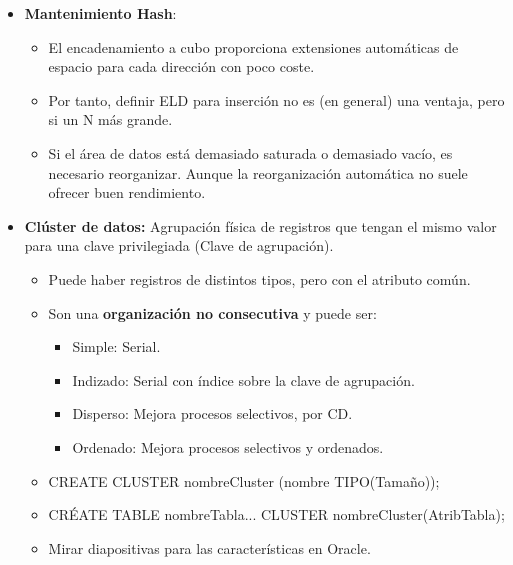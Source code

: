 \documentclass[12pt, twoside, openright]{report} %
\begin{document}
\begin{itemize}
    \item \textbf{Mantenimiento Hash}:
      

      \begin{itemize}
      \item El encadenamiento a cubo proporciona extensiones automáticas de
        espacio para cada dirección con poco coste.
        
      \item Por tanto, definir ELD para inserción no es (en general) una
        ventaja, pero si un N más grande.
        
      \item Si el área de datos está demasiado saturada o demasiado vacío,
        es necesario reorganizar. Aunque la reorganización automática no
        suele ofrecer buen rendimiento.
        
      \end{itemize}
    \item \textbf{Clúster de datos:} Agrupación física de registros que
      tengan el mismo valor para una clave privilegiada (Clave de
      agrupación).
      

      \begin{itemize}
      \item Puede haber registros de distintos tipos, pero con el atributo
        común.
        
      \item Son una \textbf{organización no consecutiva} y puede ser:
        

        \begin{itemize}
        \item Simple: Serial.
          
        \item Indizado: Serial con índice sobre la clave de agrupación.
          
        \item Disperso: Mejora procesos selectivos, por CD.
          
        \item Ordenado: Mejora procesos selectivos y ordenados.
          
        \end{itemize}
      \item CREATE CLUSTER nombreCluster (nombre TIPO(Tamaño));
        
      \item CRÉATE TABLE nombreTabla... CLUSTER nombreCluster(AtribTabla);
        
      \item Mirar diapositivas para las características en Oracle.
        
      \end{itemize}
    \end{itemize}
\end{document}
